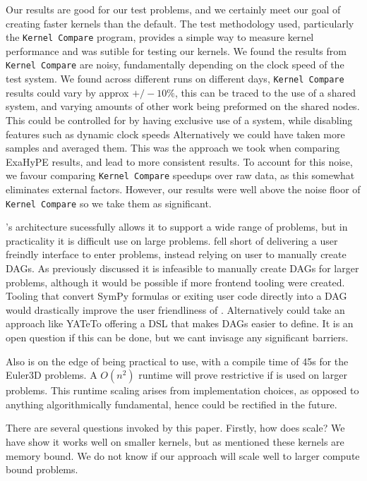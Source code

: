 Our results are good for our test problems, and we certainly meet our goal of creating faster kernels than the default.
The test methodology used, particularly the \texttt{Kernel Compare} program, provides a simple way to measure kernel performance and was sutible for testing our kernels.
We found the results from \texttt{Kernel Compare} are noisy, fundamentally depending on the clock speed of the test system.
We found across different runs on different days, \texttt{Kernel Compare} results could vary by approx $+/-10\%$, this can be traced to the use of a shared system, and varying amounts of other work being preformed on the shared nodes.
This could be controlled for by having exclusive use of a system, while disabling features such as dynamic clock speeds
Alternatively we could have taken more samples and averaged them.
This was the approach we took when comparing ExaHyPE results, and lead to more consistent results.
To account for this noise, we favour comparing \texttt{Kernel Compare} speedups over raw data, as this somewhat eliminates external factors.
However, our results were well above the noise floor of \texttt{Kernel Compare} so we take them as significant.

\phlat{}'s architecture sucessfully allows it to support a wide range of problems, but in practicality it is difficult use \phlat on large problems.
\phlat fell short of delivering a user freindly interface to enter problems, instead relying on user to manually create DAGs.
As previously discussed it is infeasible to manually create DAGs for larger problems, although it would be possible if more frontend tooling were created.
Tooling that convert SymPy formulas \cite{sympy} or exiting user code directly into a DAG would drastically improve the user friendliness of \phlat.
Alternatively \phlat could take an approach like YATeTo offering a DSL that makes DAGs easier to define.
It is an open question if this can be done, but we cant invisage any significant barriers.

Also \phlat is on the edge of being practical to use, with a compile time of 45s for the Euler3D problems.
A $O(n^2)$ runtime will prove restrictive if \phlat is used on larger problems.
This runtime scaling arises from implementation choices, as opposed to anything algorithmically fundamental, hence could be rectified in the future.

There are several questions invoked by this paper.
Firstly, how does \phlat scale?
We have show it works well on smaller kernels, but as mentioned these kernels are memory bound.
We do not know if our approach will scale well to larger compute bound problems.

